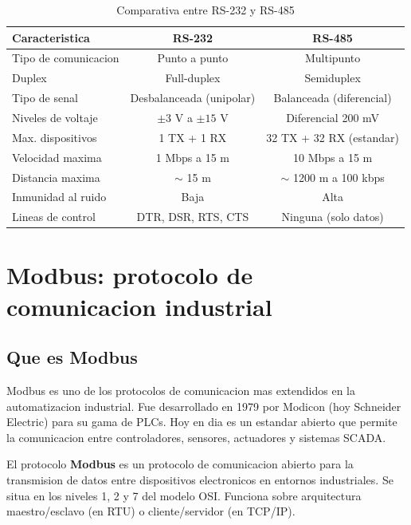 \begin{table}[H]
    \centering
    \caption{Comparativa entre RS-232 y RS-485}
    \label{tab:rs232_vs_rs485}
    \begin{tabular}{|l|c|c|}
        \hline
        \textbf{Caracteristica} & \textbf{RS-232} & \textbf{RS-485} \\
        \hline
        Tipo de comunicacion & Punto a punto & Multipunto \\
        \hline
        Duplex & Full-duplex & Semiduplex \\
        \hline
        Tipo de senal & Desbalanceada (unipolar) & Balanceada (diferencial) \\
        \hline
        Niveles de voltaje & $\pm 3$ V a $\pm 15$ V & Diferencial 200 mV \\
        \hline
        Max. dispositivos & 1 TX + 1 RX & 32 TX + 32 RX (estandar) \\
        \hline
        Velocidad maxima & 1 Mbps a 15 m & 10 Mbps a 15 m \\
        \hline
        Distancia maxima & $\sim$ 15 m & $\sim$ 1200 m a 100 kbps \\
        \hline
        Inmunidad al ruido & Baja & Alta \\
        \hline
        Lineas de control & DTR, DSR, RTS, CTS & Ninguna (solo datos) \\
        \hline
    \end{tabular}
\end{table}


\section{Modbus: protocolo de comunicacion industrial}

\subsection{Que es Modbus}

Modbus es uno de los protocolos de comunicacion mas extendidos en la
automatizacion industrial. Fue desarrollado en 1979 por Modicon (hoy Schneider
Electric) para su gama de PLCs. Hoy en dia es un estandar abierto que permite
la comunicacion entre controladores, sensores, actuadores y sistemas SCADA.

\begin{definicion}[Modbus]
El protocolo \textbf{Modbus} es un protocolo de comunicacion abierto para la
transmision de datos entre dispositivos electronicos en entornos industriales.
Se situa en los niveles 1, 2 y 7 del modelo OSI. Funciona sobre arquitectura
maestro/esclavo (en RTU) o cliente/servidor (en TCP/IP).
\end{definicion}

